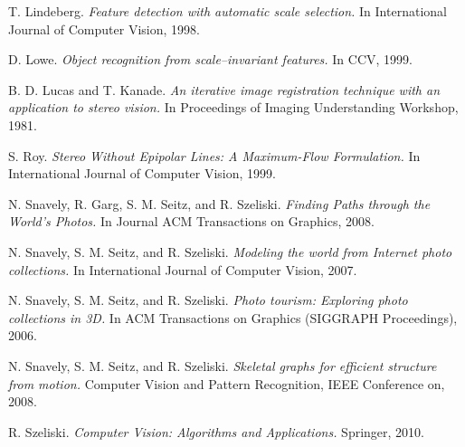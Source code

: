 \begin{thebibliography}{99}
  
  {\sc T. Lindeberg.} 
  \emph{Feature detection with automatic scale selection.}
  In International Journal of Computer Vision, 1998.

  {\sc D. Lowe.} 
  \emph{Object recognition from scale–invariant features.}
  In CCV, 1999.

  {\sc B. D. Lucas and T. Kanade. } 
  \emph{An iterative image registration technique with an application to stereo vision.}
  In Proceedings of Imaging Understanding Workshop, 1981.

  {\sc S. Roy.} 
  \emph{Stereo Without Epipolar Lines: A Maximum-Flow Formulation.}
  In International Journal of Computer Vision, 1999.

  {\sc N. Snavely, R. Garg, S. M. Seitz, and R. Szeliski.} 
  \emph{Finding Paths through the World's Photos.}
  In Journal ACM Transactions on Graphics, 2008.

  {\sc N. Snavely, S. M. Seitz, and R. Szeliski.} 
  \emph{Modeling the world from Internet photo collections.}
  In International Journal of Computer Vision, 2007.

  {\sc N. Snavely, S. M. Seitz, and R. Szeliski.} 
  \emph{Photo tourism: Exploring photo collections in 3D.}
  In ACM Transactions on Graphics (SIGGRAPH Proceedings), 2006.

  {\sc N. Snavely, S. M. Seitz, and R. Szeliski.} 
  \emph{Skeletal graphs for efficient structure from motion.}
  Computer Vision and Pattern Recognition, IEEE Conference on, 2008.

  {\sc R. Szeliski.}
  \emph{Computer Vision: Algorithms and Applications.}
  Springer, 2010. 


\end{thebibliography}
